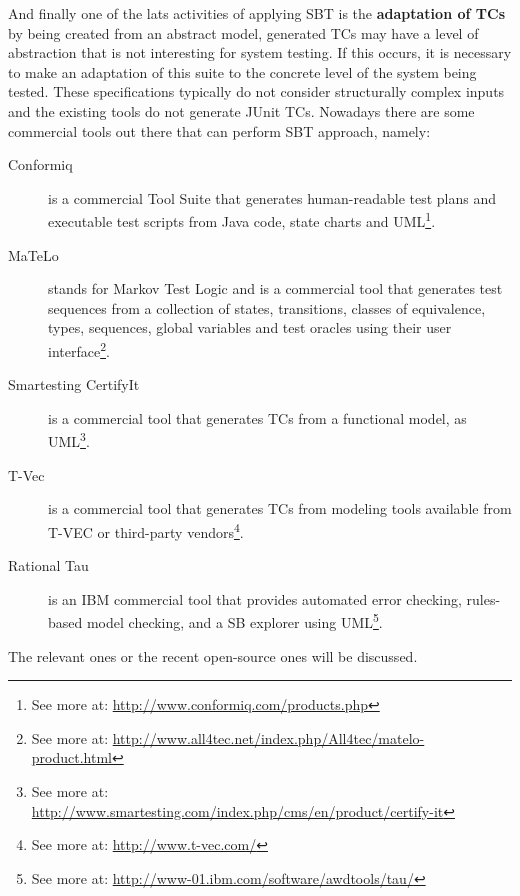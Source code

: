 And finally one of the lats activities of applying \ac{SBT} is the
\textbf{adaptation of \ac{TC}s} by being created from an abstract model, generated \ac{TC}s
may have a level of abstraction that is not interesting for system testing.
If this occurs, it is necessary to make an adaptation of this suite to the concrete level of the system being tested.
These specifications typically do not consider structurally complex inputs and the existing tools do not generate JUnit \ac{TC}s.
Nowadays there are some commercial tools out there that can perform \ac{SBT} approach, namely:
\begin{description}
\item[Conformiq] is a commercial Tool Suite that generates
human-readable test plans and executable test scripts from Java code, state charts and \ac{UML}\footnote{See more at: \url{http://www.conformiq.com/products.php}}.
\item[MaTeLo] stands for Markov Test Logic and is a commercial tool
that generates test sequences from a collection of states, transitions, classes of equivalence, types, sequences, global variables and test oracles
using their user interface\footnote{See more at: \url{http://www.all4tec.net/index.php/All4tec/matelo-product.html}}.
\item[Smartesting CertifyIt] is a commercial tool that generates \ac{TC}s from a functional model, as \ac{UML}\footnote{See more at: \url{http://www.smartesting.com/index.php/cms/en/product/certify-it}}.
\item[T-Vec] is a commercial tool that generates \ac{TC}s from modeling tools available from T-VEC or third-party vendors\footnote{See more at: \url{http://www.t-vec.com/}}.
\item[Rational Tau] is an \ac{IBM} commercial tool that provides automated error checking, rules-based model checking, and a \ac{SB} explorer using
\ac{UML}\footnote{See more at: \url{http://www-01.ibm.com/software/awdtools/tau/}}.
\end{description}

The relevant ones or the recent open-source ones will be discussed.
